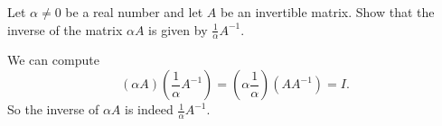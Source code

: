 \documentclass{ximera}
\begin{document}
\begin{exercise} \label{c4.8.2}
Let $\alpha \not=0$ be a real number and let $A$ be an invertible
matrix.  Show that the inverse of the matrix $\alpha A$ is given by
$\frac{1}{\alpha}A^{-1}$.

\begin{solution}
\soln
We can compute
\[ 
(\alpha A)\left(\frac{1}{\alpha}A^{-1}\right) =
\left(\alpha\frac{1}{\alpha}\right)(AA^{-1}) = I. 
\]
So the inverse of $\alpha A$ is indeed $\frac{1}{\alpha}A^{-1}$.

\end{solution}
\end{exercise}
\end{document}
